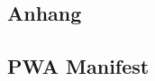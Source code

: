 \begin{appendices}
\chapter*{Anhang}
\label{chap:Anhang}

\begin{listing}
    \section{PWA Manifest}
    \inputminted{jsx}{snippets/json/manifest.json}
\end{listing}

\end{appendices}
